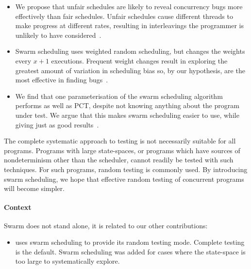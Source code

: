 \begin{itemize}
\item We propose that unfair schedules are likely to reveal
  concurrency bugs more effectively than fair schedules.  Unfair
  schedules cause different threads to make progress at different
  rates, resulting in interleavings the programmer is unlikely to have
  considered~.

\item Swarm scheduling uses weighted random scheduling, but changes
  the weights every $x+1$ executions.  Frequent weight changes result
  in exploring the greatest amount of variation in scheduling bias so,
  by our hypothesis, are the most effective in finding
  bugs~.

\item We find that one parameterisation of the swarm scheduling
  algorithm performs as well as PCT\cite{burckhardt2010}, despite not
  knowing anything about the program under test.  We argue that this
  makes swarm scheduling easier to use, while giving just as good
  results~.
\end{itemize}

The complete systematic approach to testing is not necessarily
suitable for all programs.  Programs with large state-spaces, or
programs which have sources of nondeterminism other than the
scheduler, cannot readily be tested with such techniques.  For such
programs, random testing is commonly used.  By introducing swarm
scheduling, we hope that effective random testing of concurrent
programs will become simpler.

\paragraph{Context}
Swarm does not stand alone, it is related to our other contributions:

\begin{itemize}
\item {} uses swarm scheduling to provide its random
  testing mode.  Complete testing is the default.  Swarm scheduling
  was added for cases where the state-space is too large to
  systematically explore.
\end{itemize}
